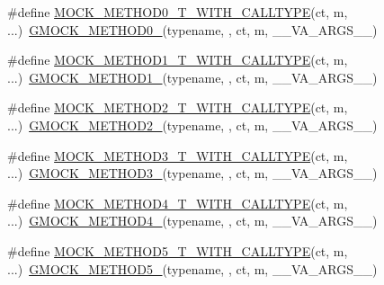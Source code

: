 \begin{DoxyCompactItemize}
\item 
\#define \mbox{\hyperlink{gmock-generated-function-mockers_8h_a68a3dcece1b6932b4dbda2216ff4fa90}{M\+O\+C\+K\+\_\+\+M\+E\+T\+H\+O\+D0\+\_\+\+T\+\_\+\+W\+I\+T\+H\+\_\+\+C\+A\+L\+L\+T\+Y\+PE}}(ct,  m, ...)~\mbox{\hyperlink{gmock-generated-function-mockers_8h_ae0d290ffa58d7c624b2e3487ba1252f4}{G\+M\+O\+C\+K\+\_\+\+M\+E\+T\+H\+O\+D0\+\_\+}}(typename, , ct, m, \+\_\+\+\_\+\+V\+A\+\_\+\+A\+R\+G\+S\+\_\+\+\_\+)
\item 
\#define \mbox{\hyperlink{gmock-generated-function-mockers_8h_a3028c1938f6b819b64400c426ef1e30d}{M\+O\+C\+K\+\_\+\+M\+E\+T\+H\+O\+D1\+\_\+\+T\+\_\+\+W\+I\+T\+H\+\_\+\+C\+A\+L\+L\+T\+Y\+PE}}(ct,  m, ...)~\mbox{\hyperlink{gmock-generated-function-mockers_8h_a1bc0012d62440dda77208dabdf4925c9}{G\+M\+O\+C\+K\+\_\+\+M\+E\+T\+H\+O\+D1\+\_\+}}(typename, , ct, m, \+\_\+\+\_\+\+V\+A\+\_\+\+A\+R\+G\+S\+\_\+\+\_\+)
\item 
\#define \mbox{\hyperlink{gmock-generated-function-mockers_8h_a18e4e8da0bdf27bde5ffca30587ff074}{M\+O\+C\+K\+\_\+\+M\+E\+T\+H\+O\+D2\+\_\+\+T\+\_\+\+W\+I\+T\+H\+\_\+\+C\+A\+L\+L\+T\+Y\+PE}}(ct,  m, ...)~\mbox{\hyperlink{gmock-generated-function-mockers_8h_a885295ca6bebb15efb3fc786218c5d47}{G\+M\+O\+C\+K\+\_\+\+M\+E\+T\+H\+O\+D2\+\_\+}}(typename, , ct, m, \+\_\+\+\_\+\+V\+A\+\_\+\+A\+R\+G\+S\+\_\+\+\_\+)
\item 
\#define \mbox{\hyperlink{gmock-generated-function-mockers_8h_a1e723cc1c62c9fedb9f54ee30c111047}{M\+O\+C\+K\+\_\+\+M\+E\+T\+H\+O\+D3\+\_\+\+T\+\_\+\+W\+I\+T\+H\+\_\+\+C\+A\+L\+L\+T\+Y\+PE}}(ct,  m, ...)~\mbox{\hyperlink{gmock-generated-function-mockers_8h_af7c77ba511c631de02bb8c45a6ed3045}{G\+M\+O\+C\+K\+\_\+\+M\+E\+T\+H\+O\+D3\+\_\+}}(typename, , ct, m, \+\_\+\+\_\+\+V\+A\+\_\+\+A\+R\+G\+S\+\_\+\+\_\+)
\item 
\#define \mbox{\hyperlink{gmock-generated-function-mockers_8h_aae18ec395b1ba3e991a25ffb997821ee}{M\+O\+C\+K\+\_\+\+M\+E\+T\+H\+O\+D4\+\_\+\+T\+\_\+\+W\+I\+T\+H\+\_\+\+C\+A\+L\+L\+T\+Y\+PE}}(ct,  m, ...)~\mbox{\hyperlink{gmock-generated-function-mockers_8h_ab6430f2cfad9de4aca5258ea559294bb}{G\+M\+O\+C\+K\+\_\+\+M\+E\+T\+H\+O\+D4\+\_\+}}(typename, , ct, m, \+\_\+\+\_\+\+V\+A\+\_\+\+A\+R\+G\+S\+\_\+\+\_\+)
\item 
\#define \mbox{\hyperlink{gmock-generated-function-mockers_8h_a04f83b372ebe63dea92cb5c3502ff345}{M\+O\+C\+K\+\_\+\+M\+E\+T\+H\+O\+D5\+\_\+\+T\+\_\+\+W\+I\+T\+H\+\_\+\+C\+A\+L\+L\+T\+Y\+PE}}(ct,  m, ...)~\mbox{\hyperlink{gmock-generated-function-mockers_8h_a9e3ecd392499ab19a4a6d3adcabf56f6}{G\+M\+O\+C\+K\+\_\+\+M\+E\+T\+H\+O\+D5\+\_\+}}(typename, , ct, m, \+\_\+\+\_\+\+V\+A\+\_\+\+A\+R\+G\+S\+\_\+\+\_\+)

\end{DoxyCompactItemize}
